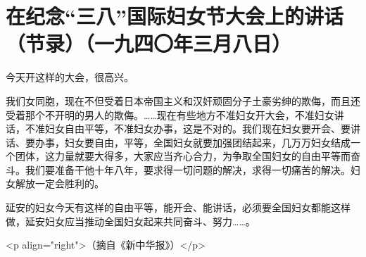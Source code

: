 \section[在纪念“三八”国际妇女节大会上的讲话（节录）（一九四〇年三月八日）]{在纪念“三八”国际妇女节大会上的讲话（节录）（一九四〇年三月八日）}


今天开这样的大会，很高兴。

我们女同胞，现在不但受着日本帝国主义和汉奸顽固分子土豪劣绅的欺侮，而且还受着那个不开明的男人的欺侮。……现在有些地方不准妇女开大会，不准妇女讲话，不准妇女自由平等，不准妇女办事，这是不对的。我们现在妇女要开会、要讲话、要办事，妇女要自由，平等，全国妇女就要加强团结起来，几万万妇女结成一个团体，这力量就要大得多，大家应当齐心合力，为争取全国妇女的自由平等而奋斗。我们要准备干他十年八年，要求得一切问题的解决，求得一切痛苦的解决。妇女解放一定会胜利的。

延安的妇女今天有这样的自由平等，能开会、能讲话，必须要全国妇女都能这样做，延安妇女应当推动全国妇女起来共同奋斗、努力……。

<p align="right">（摘自《新中华报》）</p>

